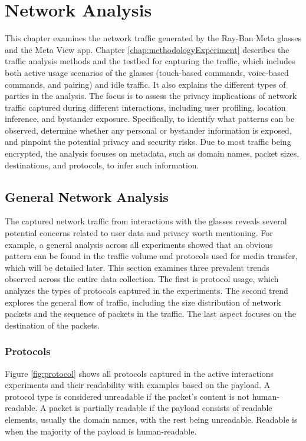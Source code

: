 \chapter{Network Analysis}
\label{chap:networkAnalysis}

This chapter examines the network traffic generated by the Ray-Ban Meta glasses and the Meta View app. Chapter \ref{chap:methodologyExperiment} describes the traffic analysis methods and the testbed for capturing the traffic, which includes both active usage scenarios of the glasses (touch-based commands, voice-based commands, and pairing) and idle traffic. It also explains the different types of parties in the analysis. The focus is to assess the privacy implications of network traffic captured during different interactions, including user profiling, location inference, and bystander exposure. Specifically, to identify what patterns can be observed, determine whether any personal or bystander information is exposed, and pinpoint the potential privacy and security risks. Due to most traffic being encrypted, the analysis focuses on metadata, such as domain names, packet sizes, destinations, and protocols, to infer such information.
 

\section{General Network Analysis}
The captured network traffic from interactions with the glasses reveals several potential concerns related to user data and privacy worth mentioning. For example, a general analysis across all experiments showed that an obvious pattern can be found in the traffic volume and protocols used for media transfer, which will be detailed later. This section examines three prevalent trends observed across the entire data collection. The first is protocol usage, which analyzes the types of protocols captured in the experiments. The second trend explores the general flow of traffic, including the size distribution of network packets and the sequence of packets in the traffic. The last aspect focuses on the destination of the packets.

\subsection*{Protocols}
\label{subsec:protocol}
Figure \ref{fig:protocol} shows all protocols captured in the active interactions experiments and their readability with examples based on the payload. A protocol type is considered unreadable if the packet's content is not human-readable. A packet is partially readable if the payload consists of readable elements, usually the domain names, with the rest being unreadable. Readable is when the majority of the payload is human-readable. 

